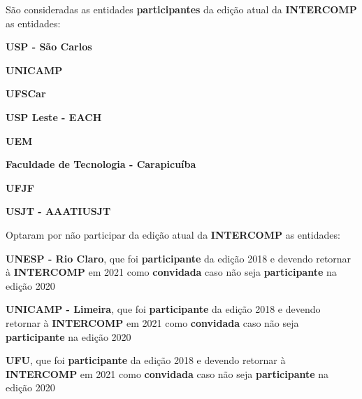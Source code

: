 
\begin{article}
	\label{art:participantes}
	São consideradas as entidades \textbf{participantes} da edição atual da \textbf{INTERCOMP} as entidades:
	\begin{description}[noitemsep]
			\item \textbf{USP - São Carlos}
			\item \textbf{UNICAMP}
			\item \textbf{UFSCar}
			\item \textbf{USP Leste - EACH}
			\item \textbf{UEM}
			\item \textbf{Faculdade de Tecnologia - Carapicuíba}
			\item \textbf{UFJF}
			\item \textbf{USJT - AAATIUSJT}
	\end{description}
\end{article}

\begin{article}
	\label{art:naoparticipantes}
	Optaram por não participar da edição atual da \textbf{INTERCOMP} as entidades:
	\begin{description}[noitemsep]
			\item \textbf{UNESP - Rio Claro}, que foi \textbf{participante} da edição 2018 e devendo retornar à \textbf{INTERCOMP} em 2021 como \textbf{convidada} caso não seja \textbf{participante} na edição 2020
			\item \textbf{UNICAMP - Limeira}, que foi \textbf{participante} da edição 2018 e devendo retornar à \textbf{INTERCOMP} em 2021 como \textbf{convidada} caso não seja \textbf{participante} na edição 2020
			\item \textbf{UFU}, que foi \textbf{participante} da edição 2018 e devendo retornar à \textbf{INTERCOMP} em 2021 como \textbf{convidada} caso não seja \textbf{participante} na edição 2020
	\end{description}
\end{article}
